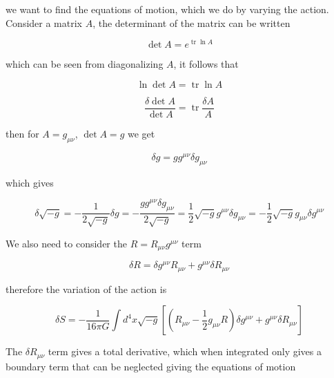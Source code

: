 \documentclass[a4paper,11pt]{article}
\numberwithin{equation}{section}
\numberwithin{figure}{section}
\begin{document}
\begin{large}
we want to find the equations of motion, which we do by varying the action. Consider a matrix $A$, the determinant of the matrix can be written

\begin{equation}
\label{det A}   
    \det A=e^{\operatorname{tr}\ln A}
\end{equation}

which can be seen from diagonalizing $A$, it follows that

\begin{equation}
\label{ln det A}    
    \ln \det A= \operatorname{tr} \ln A
\end{equation}

\begin{equation}
 \label{delta det A}   
    \frac{\delta \det A}{\det A} = \operatorname{tr} \frac{\delta A}{A}
\end{equation}


then for $A=g_{\mu \nu}$, $\det A=g$ we get


\begin{equation}
\label{delta g}    
    \delta g=g g^{\mu \nu} \delta g_{\mu \nu}
\end{equation}

\newpage

which gives

\begin{equation}
\label{delta rt -g}    
    \delta \sqrt{-g}= -\frac{1}{2\sqrt{-g}}\delta g= -\frac{gg^{\mu \nu} \delta g_{\mu \nu}}{2\sqrt{-g}}=\frac{1}{2}\sqrt{-g} g^{\mu \nu} \delta g_{\mu \nu}=-\frac{1}{2}\sqrt{-g} g_{\mu \nu} \delta g^{\mu \nu}
\end{equation}


We also need to consider the $R=R_{\mu \nu} g^{\mu \nu}$ term

\begin{equation}
\label{delta R}
    \delta R= \delta g^{\mu \nu} R_{\mu \nu}+g^{\mu \nu} \delta R_{\mu \nu}
\end{equation}

therefore the variation of the action is

\begin{equation}
\label{variation of action}
    \delta S= - \frac{1}{16\pi G} \int d^4x \sqrt{-g} [(R_{\mu \nu} -\frac{1}{2} g_{\mu \nu} R)\delta g^{\mu \nu}+g^{\mu \nu}\delta R_{\mu \nu}]
\end{equation}



The $\delta R_{\mu \nu}$ term gives a total derivative, which when integrated only gives a boundary term that can be neglected giving the equations of motion



\end{large}
\end{document}
